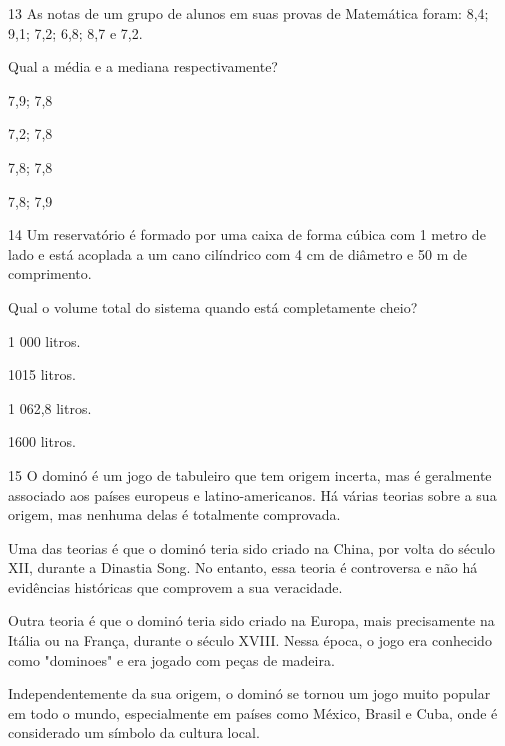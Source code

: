 \num{13} As notas de um grupo de alunos em suas provas de Matemática foram:
8,4; 9,1; 7,2; 6,8; 8,7 e 7,2.

Qual a média e a mediana respectivamente?

\begin{multicols}{2}
\begin{escolha}
\item 7,9; 7,8

\item 7,2; 7,8

\item 7,8; 7,8

\item 7,8; 7,9
\end{escolha}
\end{multicols}

\num{14} Um reservatório é formado por uma caixa de forma cúbica com 1 metro
de lado e está acoplada a um cano cilíndrico com 4 cm de diâmetro e 50 m
de comprimento.

Qual o volume total do sistema quando está completamente cheio?

\begin{escolha}
\item 1 000 litros.

\item 1015 litros.

\item 1 062,8 litros.

\item 1600 litros.
\end{escolha}


\num{15} O dominó é um jogo de tabuleiro que tem origem incerta, mas é
geralmente associado aos países europeus e latino-americanos. Há várias
teorias sobre a sua origem, mas nenhuma delas é totalmente comprovada.

Uma das teorias é que o dominó teria sido criado na China, por volta do
século XII, durante a Dinastia Song. No entanto, essa teoria é
controversa e não há evidências históricas que comprovem a sua
veracidade.

Outra teoria é que o dominó teria sido criado na Europa, mais
precisamente na Itália ou na França, durante o século XVIII. Nessa
época, o jogo era conhecido como "dominoes" e era jogado com peças de
madeira.

Independentemente da sua origem, o dominó se tornou um jogo muito
popular em todo o mundo, especialmente em países como México, Brasil e
Cuba, onde é considerado um símbolo da cultura local.

